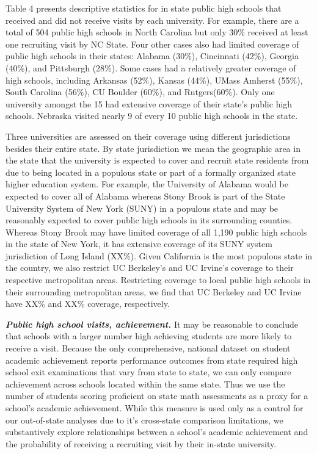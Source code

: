 \documentclass[twoside]{article}
\begin{document}
Table 4 presents descriptive statistics for in state public high schools that received and did not receive visits by each university. For example, there are a total of 504 public high schools in North Carolina but only 30\% received at least one recruiting visit by NC State.  Four other cases also had limited coverage of public high schools in their states: Alabama (30\%), Cincinnati (42\%), Georgia (40\%), and Pittsburgh (28\%). Some cases had a relatively greater coverage of high schools, including Arkansas (52\%), Kansas (44\%), UMass Amherst (55\%), South Carolina (56\%), CU Boulder (60\%), and Rutgers(60\%). Only one university amongst the 15 had extensive coverage of their state’s public high schools. Nebraska visited nearly 9 of every 10 public high schools in the state. 

Three universities are assessed on their coverage using different jurisdictions besides their entire state. By state jurisdiction we mean the geographic area in the state that the university is expected to cover and recruit state residents from due to being located in a populous state or part of a formally organized state higher education system. For example, the University of Alabama would be expected to cover all of Alabama whereas Stony Brook is part of the State University System of New York (SUNY) in a populous state and may be reasonably expected to cover public high schools in its surrounding counties. Whereas Stony Brook may have limited coverage of all 1,190 public high schools in the state of New York, it has extensive coverage of its SUNY system jurisdiction of Long Island (XX\%). Given California is the most populous state in the country, we also restrict UC Berkeley's and UC Irvine's coverage to their respective metropolitan areas. Restricting coverage to local public high schools in their surrounding metropolitan areas, we find that UC Berkeley and UC Irvine have XX\% and XX\% coverage, respectively. 

\textbf{\textit{Public high school visits, achievement.}} It may be reasonable to conclude that schools with a larger number high achieving students are more likely to receive a visit. Because the only comprehensive, national dataset on student academic achievement reports performance outcomes from state required high school exit examinations that vary from state to state, we can only compare achievement across schools located within the same state. Thus we use the number of students scoring proficient on state math assessments as a proxy for a school's academic achievement. While this measure is used only as a control for our out-of-state analyses due to it's cross-state comparison limitations, we substantively explore relationships between a school's academic achievement and the probability of receiving a recruiting visit by their in-state university.  
\end{document}
